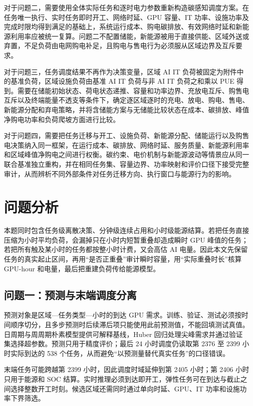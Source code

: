 \documentclass[withoutpreface,bwprint]{cumcmthesis}
\begin{document}
对于问题二，需要使用全体实际任务和逐时电力参数重新构造碳感知调度方案。在任务唯一执行、实时任务即时开工、网络时延、GPU 容量、IT 功率、设施功率及完成时限均得到满足的基础上，系统运行成本、购电碳排放、有效网络时延和新能源利用率应被统一复算。问题二不配置储能，新能源被用于直接供能、区域外送或弃置，不足负荷由电网购电补足，且购电与售电行为必须服从区域边界及互斥要求。

对于问题三，任务调度结果不再作为决策变量，区域 AI IT 负荷被固定为附件中的基准负荷，区域设施负荷由基准 AI IT 负荷与非 AI IT 负荷之和乘以 PUE 得到。需要在储能初始状态、荷电状态递推、容量和功率边界、充放电互斥、购售电互斥以及终端能量不透支等条件下，确定逐区域逐时的充电、放电、购电、售电、新能源分配和弃电策略，并将含储能方案与无储能比较状态在成本、碳排放、峰值净购电功率和负荷爬坡方面进行比较。

对于问题四，需要把任务迁移与开工、设施负荷、新能源分配、储能运行以及购售电决策纳入同一框架，在运行成本、碳排放、网络时延、服务质量、新能源利用率和区域峰值净购电之间进行权衡。碳约束、电价机制与新能源波动等情景应从同一联合基准独立重构，并在相同任务集、容量边界、功率映射和评价口径下接受完整审计，从而辨析不同外部条件对任务迁移方向、执行窗口与能源行为的影响。

\section{问题分析}
本题同时包含任务级离散决策、分钟级连续占用和小时级能源结算。若把任务直接压缩为小时平均负荷，会漏掉只在小时内短暂重叠却造成瞬时 GPU 峰值的任务；若把所有触及某小时的任务都按整小时计费，又会高估 AI 电量。因此本文先保留任务的真实起止区间，再用“是否正重叠”审计瞬时容量，用“实际重叠时长”核算 GPU-hour 和电量，最后把重建负荷传给能源模型。

\subsection{问题一：预测与末端调度分离}
预测对象是区域—任务类型—小时的到达 GPU 需求。训练、验证、测试必须按时间顺序切分，且多步预测时后续滞后项只能使用此前预测值，不能回填测试真值。日周期与周周期朴素模型提供可解释基线，Huber 回归处理尖峰需求并通过验证集选择超参数\cite{huber1964robust}。预测只用于精度评价；最后 24 小时调度仍读取第 2376 至 2399 小时实际到达的 538 个任务，从而避免“以预测量替代真实任务”的口径错误。

末端任务可能跨越第 2399 小时，因此调度时域延伸到第 2405 小时；第 2406 小时只用于能源和 SOC 结算。实时推理必须到达即开工，弹性任务可在到达与截止之间选择整数开工时刻。候选区域还需同时通过单向时延、GPU、IT 功率和设施功率下界筛选。
\end{document}
